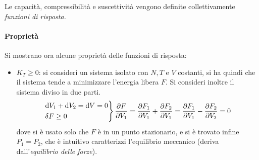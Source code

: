 \begin{defn}
	Le capacità, compressibilità e suscettività vengono definite collettivamente \textit{funzioni di risposta.}
\end{defn} 

\paragraph{Proprietà} Si mostrano ora alcune proprietà delle funzioni di risposta:
\begin{itemize}
	\item $K_T \geq 0$: si consideri un sistema isolato con $N,T$ e $V$ costanti, si ha quindi che il sistema tende a minimizzare l'energia libera $F$. Si consideri inoltre il sistema diviso in due parti.
	\begin{align*}
	\begin{rcases*}
	\dd V_1 + \dd V_2 = \dd V = 0\\
	\delta F \geq 0
	\end{rcases*}
		 \frac{\partial F}{\partial V_1} = \frac{\partial F_1}{\partial V_1} + \frac{\partial F_2}{\partial V_1} = \frac{\partial F_1}{\partial V_1} - \frac{\partial F_2}{\partial V_2} = 0
	\end{align*}
	dove si è usato solo che $F$ è in un punto stazionario, e si è trovato infine $P_1 = P_2$, che è intuitivo caratterizzi l'equilibrio meccanico (deriva dall'\textit{equilibrio delle forze}).
	

\end{itemize}
